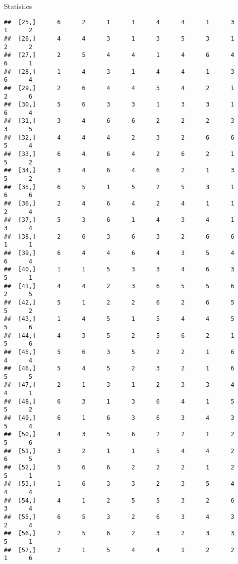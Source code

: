 \documentclass[
  ignorenonframetext,
]{beamer}
\begin{document}
\begin{frame}[fragile]{Statistics}
\begin{verbatim}
##  [25,]      6      2      1      1      4      4      1      3      1      2
##  [26,]      4      4      3      1      3      5      3      1      2      2
##  [27,]      2      5      4      4      1      4      6      4      6      1
##  [28,]      1      4      3      1      4      4      1      3      6      4
##  [29,]      2      6      4      4      5      4      2      1      2      6
##  [30,]      5      6      3      3      1      3      3      1      6      4
##  [31,]      3      4      6      6      2      2      2      3      3      5
##  [32,]      4      4      4      2      3      2      6      6      5      4
##  [33,]      6      4      6      4      2      6      2      1      5      2
##  [34,]      3      4      6      4      6      2      1      3      5      2
##  [35,]      6      5      1      5      2      5      3      1      6      6
##  [36,]      2      4      6      4      2      4      1      1      2      4
##  [37,]      5      3      6      1      4      3      4      1      3      4
##  [38,]      2      6      3      6      3      2      6      6      1      1
##  [39,]      6      4      4      6      4      3      5      4      6      4
##  [40,]      1      1      5      3      3      4      6      3      5      1
##  [41,]      4      4      2      3      6      5      5      6      2      5
##  [42,]      5      1      2      2      6      2      6      5      5      2
##  [43,]      1      4      5      1      5      4      4      5      5      6
##  [44,]      4      3      5      2      5      6      2      1      5      6
##  [45,]      5      6      3      5      2      2      1      6      4      4
##  [46,]      5      4      5      2      3      2      1      6      5      5
##  [47,]      2      1      3      1      2      3      3      4      4      1
##  [48,]      6      3      1      3      6      4      1      5      5      2
##  [49,]      6      1      6      3      6      3      4      3      5      4
##  [50,]      4      3      5      6      2      2      1      2      5      6
##  [51,]      3      2      1      1      5      4      4      2      6      5
##  [52,]      5      6      6      2      2      2      1      2      5      1
##  [53,]      1      6      3      3      2      3      5      4      4      4
##  [54,]      4      1      2      5      5      3      2      6      3      4
##  [55,]      6      5      3      2      6      3      4      3      2      4
##  [56,]      2      5      6      2      3      2      3      3      5      1
##  [57,]      2      1      5      4      4      1      2      2      1      6

\end{verbatim}
\end{frame}
\end{document}
